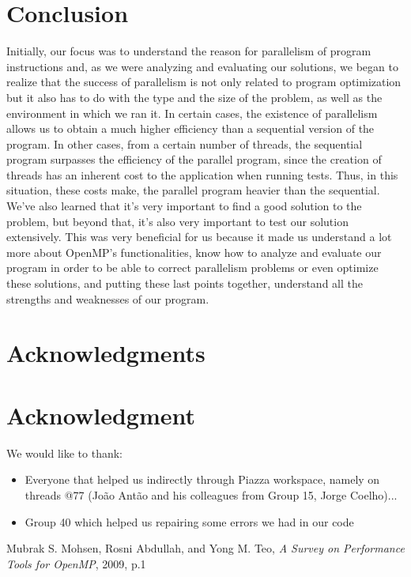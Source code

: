 \documentclass[10pt,journal,compsoc]{IEEEtran}
\begin{document}
\section{Conclusion}
Initially, our focus was to understand the reason for parallelism of program instructions and, as we were analyzing and evaluating our solutions, we began to realize that the success of parallelism is not only related to program optimization but it also has to do with the type and the size of the problem, as well as the environment in which we ran it. In certain cases, the existence of parallelism allows us to obtain a much higher efficiency than a sequential version of the program. In other cases, from a certain number of threads, the sequential program surpasses the efficiency of the parallel program, since the creation of threads has an inherent cost to the application when running tests. Thus, in this situation, these costs make, the parallel program heavier than the sequential.\\
We've also learned that it's very important to find a good solution to the problem, but beyond that, it's also very important to test our solution extensively. This was very beneficial for us because it made us understand a lot more about OpenMP's functionalities, know how to analyze and evaluate our program in order to be able to correct parallelism problems or even optimize these solutions, and putting these last points together, understand all the strengths and weaknesses of our program.



\ifCLASSOPTIONcompsoc
  \section*{Acknowledgments}
\else
  \section*{Acknowledgment}
\fi


We would like to thank:
\begin{itemize}
    \item Everyone that helped us indirectly through Piazza workspace, namely on threads @77 (João Antão and his colleagues from Group 15, Jorge Coelho)...
    \item Group 40 which helped us repairing some errors we had in our code 
\end{itemize}

\ifCLASSOPTIONcaptionsoff
  \newpage
\fi


\begin{thebibliography}{1}

Mubrak S. Mohsen, Rosni Abdullah, and Yong M. Teo, \emph{A Survey on Performance Tools for OpenMP}, 2009, p.1

\end{thebibliography}

\end{document}

